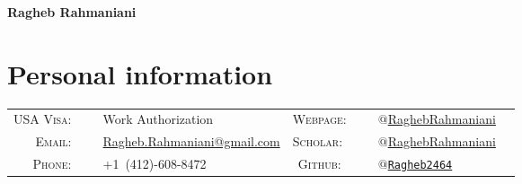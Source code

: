\documentclass[10PT,letter]{article}
\title{}
\newcommand{\numbox}[1]{} %
\begin{document}
\noindent{}%
{
	\fontsize{34}{36}\mdseries\upshape\sffamily\bfseries Ragheb Rahmaniani
}

\vspace{1.0cm}

\section*{\numbox{1}\bfseries\textcolor{titlecol}{\sffamily Personal information}}
              \begin{tabular}{rlcrl}
	               \small\textsc{USA Visa:}~~~ & \small Work Authorization  	
	               																					& \small\textsc{Webpage:}~~~ &  \multicolumn{1}{l}{
	               																						\small \href{https://sites.google.com/view/raghebrahmaniani/home}{{$@$RaghebRahmaniani }}
	               																					}
	               \\[.5mm]
	               
	                \small\textsc{Email:}~~~ & \small {\href{mailto:ragheb.rahmaniani@gmail.com}{Ragheb.Rahmaniani@gmail.com}}   
	                																				& \small\textsc{Scholar:} ~~~ &  \multicolumn{1}{l}{
	                																					\small  \small\href{https://scholar.google.com/citations?user=3V2o0Q0AAAAJ\&hl=en}{$@$RaghebRahmaniani}
	                																				}
	                \\[.5mm]
	                \small\textsc{Phone:}~~~ & \small +1~(412)-608-8472   
	                																				&  \small\textsc{Github:}~~~ & \multicolumn{1}{l}{
	                																					\small \small\href{https://github.com/Ragheb2464}{\texttt{$@$Ragheb2464}}  
                																					}
					\\[.5mm]	               
              \end{tabular}
\end{document}
